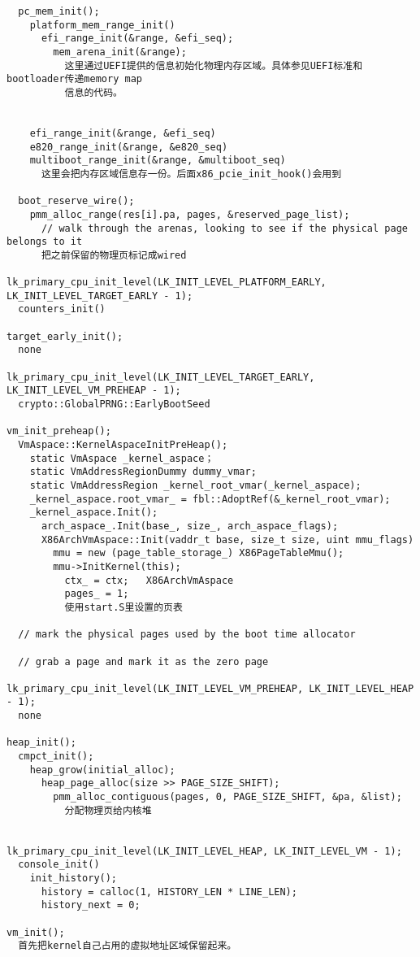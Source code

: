 \begin{verbatim}
  pc_mem_init();
    platform_mem_range_init()
      efi_range_init(&range, &efi_seq);
        mem_arena_init(&range);
          这里通过UEFI提供的信息初始化物理内存区域。具体参见UEFI标准和bootloader传递memory map
          信息的代码。

        
    efi_range_init(&range, &efi_seq)
    e820_range_init(&range, &e820_seq)
    multiboot_range_init(&range, &multiboot_seq)
      这里会把内存区域信息存一份。后面x86_pcie_init_hook()会用到

  boot_reserve_wire();
    pmm_alloc_range(res[i].pa, pages, &reserved_page_list);
      // walk through the arenas, looking to see if the physical page belongs to it
      把之前保留的物理页标记成wired

lk_primary_cpu_init_level(LK_INIT_LEVEL_PLATFORM_EARLY, LK_INIT_LEVEL_TARGET_EARLY - 1);
  counters_init()

target_early_init();
  none

lk_primary_cpu_init_level(LK_INIT_LEVEL_TARGET_EARLY, LK_INIT_LEVEL_VM_PREHEAP - 1);
  crypto::GlobalPRNG::EarlyBootSeed

vm_init_preheap();
  VmAspace::KernelAspaceInitPreHeap();
    static VmAspace _kernel_aspace；
    static VmAddressRegionDummy dummy_vmar;
    static VmAddressRegion _kernel_root_vmar(_kernel_aspace);
    _kernel_aspace.root_vmar_ = fbl::AdoptRef(&_kernel_root_vmar);
    _kernel_aspace.Init();
      arch_aspace_.Init(base_, size_, arch_aspace_flags);
      X86ArchVmAspace::Init(vaddr_t base, size_t size, uint mmu_flags)
        mmu = new (page_table_storage_) X86PageTableMmu();
        mmu->InitKernel(this);
          ctx_ = ctx;   X86ArchVmAspace
          pages_ = 1;
          使用start.S里设置的页表

  // mark the physical pages used by the boot time allocator

  // grab a page and mark it as the zero page

lk_primary_cpu_init_level(LK_INIT_LEVEL_VM_PREHEAP, LK_INIT_LEVEL_HEAP - 1);
  none

heap_init();
  cmpct_init();
    heap_grow(initial_alloc);
      heap_page_alloc(size >> PAGE_SIZE_SHIFT);
        pmm_alloc_contiguous(pages, 0, PAGE_SIZE_SHIFT, &pa, &list);
          分配物理页给内核堆
          

lk_primary_cpu_init_level(LK_INIT_LEVEL_HEAP, LK_INIT_LEVEL_VM - 1);
  console_init()
    init_history();
      history = calloc(1, HISTORY_LEN * LINE_LEN);
      history_next = 0;

vm_init();
  首先把kernel自己占用的虚拟地址区域保留起来。


\end{verbatim}
